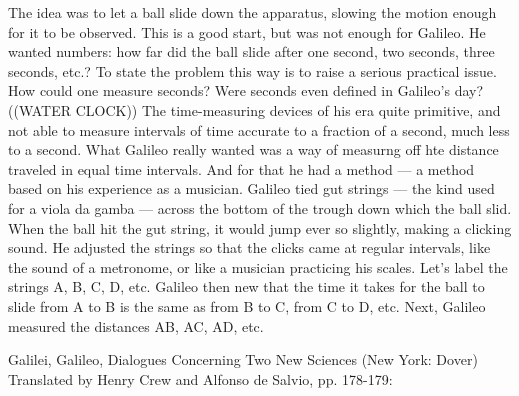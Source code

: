 
The idea was to let a ball slide down
the apparatus, slowing the motion
enough for it to be observed. This is
a good start, but was not enough for
Galileo. He wanted numbers: how far
did the ball slide after one second,
two seconds, three seconds, etc.? To
state the problem this way is to raise
a serious practical issue. How could
one measure seconds? Were seconds
even defined in Galileo's day? ((WATER
CLOCK)) The time-measuring devices of
his era quite primitive, and not able
to measure intervals of time accurate
to a fraction of a second, much less
to a second. What Galileo really wanted
was a way of measurng off hte distance
traveled in equal time intervals. And
for that he had a method — a method
based on his experience as a musician.
Galileo tied gut strings — the kind
used for a viola da gamba — across the
bottom of the trough down which the
ball slid. When the ball hit the gut
string, it would jump ever so slightly,
making a clicking sound. He adjusted
the strings so that the clicks came
at regular intervals, like the sound
of a metronome, or like a musician
practicing his scales. Let's label the
strings A, B, C, D, etc. Galileo then
new that the time it takes for the
ball to slide from A to B is the same
as from B to C, from C to D, etc.
Next, Galileo measured the distances
AB, AC, AD, etc.


Galilei, Galileo, Dialogues Concerning Two New Sciences (New York: Dover)
Translated by Henry Crew and Alfonso de Salvio, pp. 178-179:

